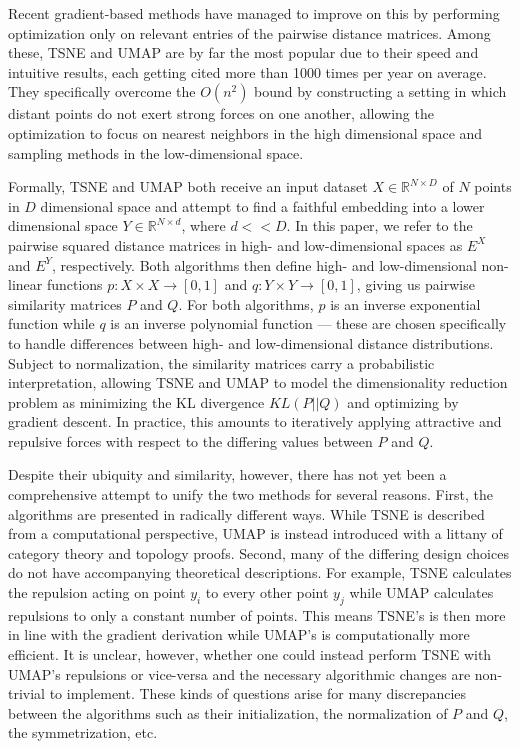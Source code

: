\documentclass[sigconf, nonacm]{acmart}
\begin{document}
Recent gradient-based methods have managed to improve on this by performing optimization only on relevant entries of the pairwise distance matrices.
Among these, TSNE and UMAP are by far the most popular due to their speed and intuitive results, each getting cited more than 1000 times per year on average.
They specifically overcome the $O(n^2)$ bound by constructing a setting in which distant points do not exert strong forces on one another, allowing the optimization to focus on nearest neighbors in the high dimensional space and sampling methods in the low-dimensional space.

Formally, TSNE \cite{van2008visualizing} and UMAP \cite{mcinnes2018umap} both receive an input dataset $X \in \mathbb{R}^{N \times D}$ of
$N$ points in $D$ dimensional space and
attempt to find a faithful embedding into a lower dimensional space $Y \in \mathbb{R}^{N \times d}$, where $d << D$. 
 In this paper, we refer to the pairwise squared distance matrices in high- and low-dimensional spaces as $E^X$ and $E^Y$, respectively. Both algorithms then define high-
 and low-dimensional non-linear functions $p: X \times X \rightarrow [0, 1]$ and $q: Y \times Y \rightarrow [0, 1]$, giving us pairwise similarity matrices $P$
 and $Q$. For both algorithms, $p$ is an inverse exponential function while $q$ is an inverse polynomial function --- these are chosen specifically to handle
 differences between high- and low-dimensional distance distributions. Subject to normalization, the similarity matrices carry a probabilistic interpretation,
 allowing TSNE and UMAP to model the dimensionality reduction problem as minimizing the KL divergence $KL(P || Q)$ and optimizing by gradient descent. In
 practice, this amounts to iteratively applying attractive and repulsive forces with respect to the differing values between $P$ and $Q$.

Despite their ubiquity and similarity, however, there has not yet been a comprehensive attempt to unify the two methods for several reasons.
First, the algorithms are presented in radically different ways. While TSNE is described from a computational perspective, UMAP is instead introduced with
a littany of category theory and topology proofs. Second, many of the differing design choices do not have accompanying theoretical descriptions. For example,
TSNE calculates the repulsion acting on point $y_i$ to every other point $y_j$ while UMAP calculates repulsions to only a constant number of points. This means
TSNE's is then more in line with the gradient derivation while UMAP's is computationally more efficient. It is unclear, however, whether one could instead
perform TSNE with UMAP's repulsions or vice-versa and the necessary algorithmic changes are non-trivial to implement. These kinds of questions arise for many
discrepancies between the algorithms such as their initialization, the normalization of $P$ and $Q$, the symmetrization, etc.
\end{document}
